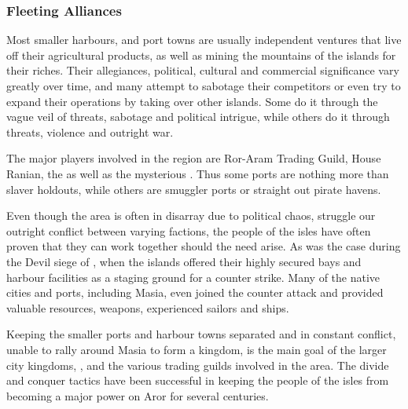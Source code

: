 \subsubsection{Fleeting Alliances}

Most smaller harbours, and port towns are usually independent ventures that
live off their agricultural products, as well as mining the mountains of
the islands for their riches. Their allegiances, political, cultural and
commercial significance vary greatly over time, and many attempt to sabotage
their competitors or even try to expand their operations by taking over other
islands. Some do it through the vague veil of threats, sabotage and political
intrigue, while others do it through threats, violence and outright war.

The major players involved in the region are Ror-Aram Trading Guild, House
Ranian, the  as well as the mysterious
. Thus some ports are nothing more than slaver
holdouts, while others are smuggler ports or straight out pirate havens.

Even though the area is often in disarray due to political chaos, struggle our
outright conflict between varying factions, the people of the isles have often
proven that they can work together should the need arise. As was the case during
the Devil siege of , when the islands offered their highly
secured bays and harbour facilities as a staging ground for a counter strike.
Many of the native cities and ports, including Masia, even joined the counter
attack and provided valuable resources, weapons, experienced sailors and ships.

Keeping the smaller ports and harbour towns separated and in constant
conflict, unable to rally around Masia to form a kingdom, is the main goal of
the larger city kingdoms, , and the various trading
guilds involved in the area. The divide and conquer tactics have been
successful in keeping the people of the isles from becoming a major power on
Aror for several centuries.
